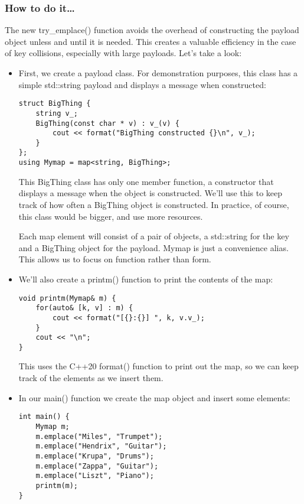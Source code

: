 \subsubsection{How to do it…}

The new try\_emplace() function avoids the overhead of constructing the payload object unless and until it is needed. This creates a valuable efficiency in the case of key collisions, especially with large payloads. Let's take a look:

\begin{itemize}
\item 
First, we create a payload class. For demonstration purposes, this class has a simple std::string payload and displays a message when constructed:

\begin{lstlisting}[style=styleCXX]
struct BigThing {
	string v_;
	BigThing(const char * v) : v_(v) {
		cout << format("BigThing constructed {}\n", v_);
	}
};
using Mymap = map<string, BigThing>;
\end{lstlisting}

This BigThing class has only one member function, a constructor that displays a message when the object is constructed. We'll use this to keep track of how often a BigThing object is constructed. In practice, of course, this class would be bigger, and use more resources.

Each map element will consist of a pair of objects, a std::string for the key and a BigThing object for the payload. Mymap is just a convenience alias. This allows us to focus on function rather than form.

\item 
We'll also create a printm() function to print the contents of the map:

\begin{lstlisting}[style=styleCXX]
void printm(Mymap& m) {
	for(auto& [k, v] : m) {
		cout << format("[{}:{}] ", k, v.v_);
	}
	cout << "\n";
}
\end{lstlisting}

This uses the C++20 format() function to print out the map, so we can keep track of the elements as we insert them.

\item 
In our main() function we create the map object and insert some elements:

\begin{lstlisting}[style=styleCXX]
int main() {
	Mymap m;
	m.emplace("Miles", "Trumpet");
	m.emplace("Hendrix", "Guitar");
	m.emplace("Krupa", "Drums");
	m.emplace("Zappa", "Guitar");
	m.emplace("Liszt", "Piano");
	printm(m);
}
\end{lstlisting}


\end{itemize}
